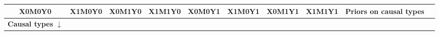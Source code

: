 \documentclass[12pt,]{book}
\begin{document}
\begin{longtable}[]{@{}cccccccccc@{}}
\begin{minipage}[b]{0.05\columnwidth}
X0M0Y0\strut
\end{minipage} & \begin{minipage}[b]{0.05\columnwidth}\centering
X1M0Y0\strut
\end{minipage} & \begin{minipage}[b]{0.05\columnwidth}\centering
X0M1Y0\strut
\end{minipage} & \begin{minipage}[b]{0.05\columnwidth}\centering
X1M1Y0\strut
\end{minipage} & \begin{minipage}[b]{0.05\columnwidth}\centering
X0M0Y1\strut
\end{minipage} & \begin{minipage}[b]{0.05\columnwidth}\centering
X1M0Y1\strut
\end{minipage} & \begin{minipage}[b]{0.05\columnwidth}\centering
X0M1Y1\strut
\end{minipage} & \begin{minipage}[b]{0.05\columnwidth}\centering
X1M1Y1\strut
\end{minipage} & \begin{minipage}[b]{0.14\columnwidth}\centering
Priors on causal types\strut
\end{minipage}\tabularnewline
\midrule
\endhead
\begin{minipage}[t]{0.23\columnwidth}\centering
\textbf{Causal types} \(\downarrow\)\strut
\end{minipage} & \begin{minipage}[t]{0.05\columnwidth}\centering
\strut
\end{minipage} & \begin{minipage}[t]{0.05\columnwidth}\centering
\strut
\end{minipage} & \begin{minipage}[t]{0.05\columnwidth}\centering
\strut
\end{minipage} & \begin{minipage}[t]{0.05\columnwidth}\centering
\strut
\end{minipage} & \begin{minipage}[t]{0.05\columnwidth}\centering
\strut
\end{minipage} & \begin{minipage}[t]{0.05\columnwidth}\centering
\strut
\end{minipage} & \begin{minipage}[t]{0.05\columnwidth}\centering
\strut
\end{minipage} & \begin{minipage}[t]{0.05\columnwidth}\centering

\end{minipage}
\end{longtable}
\end{document}
